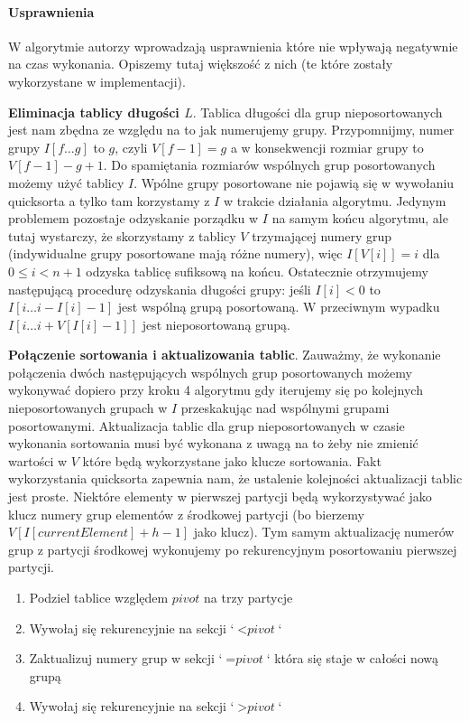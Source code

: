 \paragraph{Usprawnienia}

W algorytmie autorzy wprowadzają usprawnienia które nie wpływają negatywnie na czas wykonania. Opiszemy tutaj większość z nich (te które zostały wykorzystane w implementacji).

\textbf{Eliminacja tablicy długości $L$}. Tablica długości dla grup nieposortowanych jest nam zbędna ze względu na to jak numerujemy grupy. Przypomnijmy, numer grupy $I[f \ldots g]$ to $g$, czyli $V[f-1] = g$ a w konsekwencji rozmiar grupy to $V[f-1] - g + 1$. Do spamiętania rozmiarów wspólnych grup posortowanych możemy użyć tablicy $I$. Wpólne grupy posortowane nie pojawią się w wywołaniu quicksorta a tylko tam korzystamy z $I$ w trakcie działania algorytmu. Jedynym problemem pozostaje odzyskanie porządku w $I$ na samym końcu algorytmu, ale tutaj wystarczy, że skorzystamy z tablicy $V$ trzymającej numery grup (indywidualne grupy posortowane mają różne numery), więc $I[V[i]] = i$ dla $0 \leq i < n+1$ odzyska tablicę sufiksową na końcu. Ostatecznie otrzymujemy następującą procedurę odzyskania długości grupy: jeśli $I[i] < 0$ to $I[i \ldots i - I[i] - 1]$ jest wspólną grupą posortowaną. W przeciwnym wypadku $I[i \ldots i + V[I[i]-1]]$ jest nieposortowaną grupą. 

\textbf{Połączenie sortowania i aktualizowania tablic}. Zauważmy, że wykonanie połączenia dwóch następujących wspólnych grup posortowanych możemy wykonywać dopiero przy kroku 4 algorytmu gdy iterujemy się po kolejnych nieposortowanych grupach w $I$ przeskakując nad wspólnymi grupami posortowanymi. Aktualizacja tablic dla grup nieposortowanych w czasie wykonania sortowania musi być wykonana z uwagą na to żeby nie zmienić wartości w $V$ które będą wykorzystane jako klucze sortowania. Fakt wykorzystania quicksorta zapewnia nam, że ustalenie kolejności aktualizacji tablic jest proste. Niektóre elementy w pierwszej partycji będą wykorzystywać jako klucz numery grup elementów z środkowej partycji (bo bierzemy $V[I[currentElement] + h - 1]$ jako klucz). Tym samym aktualizację numerów grup z partycji środkowej wykonujemy po rekurencyjnym posortowaniu pierwszej partycji.
\begin{enumerate}
    \item Podziel tablice względem $pivot$ na trzy partycje
    \item Wywołaj się rekurencyjnie na sekcji `$< \textit{pivot}$`
    \item Zaktualizuj numery grup w sekcji `$= \textit{pivot}$` która się staje w całości nową grupą
    \item Wywołaj się rekurencyjnie na sekcji `$> \textit{pivot}$`
\end{enumerate}

